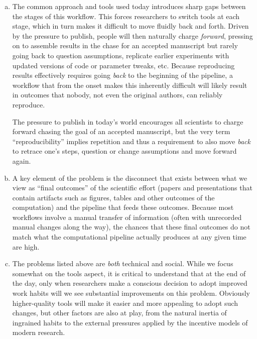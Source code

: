 \documentclass[ChapterTOCs,krantz2]{krantz} %
\begin{document}
\begin{enumerate}[(a)]

\item The common approach and tools used today introduces sharp gaps between
  the stages of this workflow.  This forces researchers to switch tools at each
  stage, which in turn makes it difficult to move fluidly back and forth.
  Driven by the pressure to publish, people will then naturally charge
  \emph{forward}, pressing on to assemble results in the chase for an accepted
  manuscript but rarely going back to question assumptions, replicate earlier
  experiments with updated versions of code or parameter tweaks, etc.  Because
  reproducing results effectively requires going \emph{back} to the
  beginning of the pipeline, a workflow that from the onset makes this
  inherently difficult will likely result in outcomes that nobody, not even the
  original authors, can reliably reproduce.

  The pressure to publish in today's world encourages all scientists to charge
  forward chasing the goal of an accepted manuscript, but the very term
  ``reproducibility'' implies repetition and thus a requirement to also move
  \emph{back} to retrace one's steps, question or change assumptions and move
  forward again.

\item A key element of the problem is the disconnect that exists between what
  we view as ``final outcomes'' of the scientific effort (papers and
  presentations that contain artifacts such as figures, tables and other
  outcomes of the computation) and the pipeline that feeds these outcomes.
  Because most workflows involve a manual transfer of information (often with
  unrecorded manual changes along the way), the chances that these final
  outcomes do not match what the computational pipeline actually produces at any
  given time are high.

\item The problems listed above are \emph{both} technical and social.  While we
  focus somewhat on the tools aspect, it is critical to understand that at the
  end of the day, only when researchers make a conscious decision to adopt
  improved work habits will we see substantial improvements on this problem.
  Obviously higher-quality tools will make it easier and more appealing to
  adopt such changes, but other factors are also at play, from the natural
  inertia of ingrained habits to the external pressures applied by the
  incentive models of modern research.
\end{enumerate}
\end{document}
